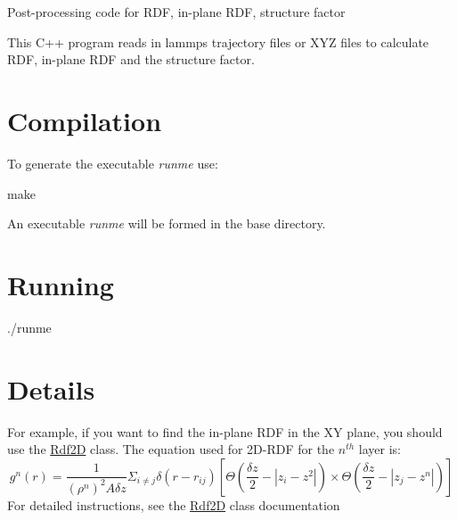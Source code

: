 Post-\/processing code for R\+DF, in-\/plane R\+DF, structure factor

This C++ program reads in lammps trajectory files or X\+YZ files to calculate R\+DF, in-\/plane R\+DF and the structure factor.

\section*{Compilation}

To generate the executable {\itshape runme} use\+:


\begin{DoxyCode}
make 
\end{DoxyCode}


An executable {\itshape runme} will be formed in the base directory.

\section*{Running}


\begin{DoxyCode}
./runme
\end{DoxyCode}


\section*{Details}


\begin{DoxyItemize}
\item For example, if you want to find the in-\/plane R\+DF in the XY plane, you should use the \mbox{\hyperlink{classRdf2D}{Rdf2D}} class. The equation used for 2\+D-\/\+R\+DF for the $n^{th}$ layer is\+: \[ g^n(r) = \frac{1}{(\rho^n)^2 A \delta z} \Sigma_{i \neq j} \delta(r - r_{ij}) \left[ \Theta\left( \frac{\delta z}{2}-|z_i-z^2| \right) \times \Theta\left( \frac{\delta z}{2}-|z_j-z^n| \right) \right] \] For detailed instructions, see the \mbox{\hyperlink{classRdf2D}{Rdf2D}} class documentation 
\end{DoxyItemize}